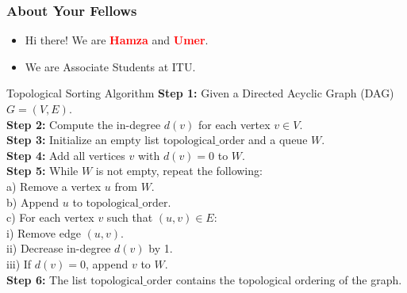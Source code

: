


\begin{frame}
    \frametitle{About Your Fellows}
    \begin{itemize}
        \item Hi there! We are \textcolor{red}{\textbf{Hamza}} {and }\textcolor{red}{\textbf{Umer}}.
        \item We are Associate Students at ITU.
    \end{itemize}
\end{frame}



\begin{frame}{Topological Sorting Algorithm}
    \textbf{Step 1:} Given a Directed Acyclic Graph (DAG) \( G = (V, E) \). \\
    \textbf{Step 2:} Compute the in-degree \( d(v) \) for each vertex \( v \in V \). \\
    \textbf{Step 3:} Initialize an empty list \( \text{topological\_order} \) and a queue \( W \). \\
    \textbf{Step 4:} Add all vertices \( v \) with \( d(v) = 0 \) to \( W \). \\
    \textbf{Step 5:} While \( W \) is not empty, repeat the following: \\
    \hspace{1cm} a) Remove a vertex \( u \) from \( W \). \\
    \hspace{1cm} b) Append \( u \) to \( \text{topological\_order} \). \\
    \hspace{1cm} c) For each vertex \( v \) such that \( (u, v) \in E \): \\
    \hspace{2cm} i) Remove edge \( (u, v) \). \\
    \hspace{2cm} ii) Decrease in-degree \( d(v) \) by 1. \\
    \hspace{2cm} iii) If \( d(v) = 0 \), append \( v \) to \( W \). \\
    \textbf{Step 6:} The list \( \text{topological\_order} \) contains the topological ordering of the graph. \\
\end{frame}





